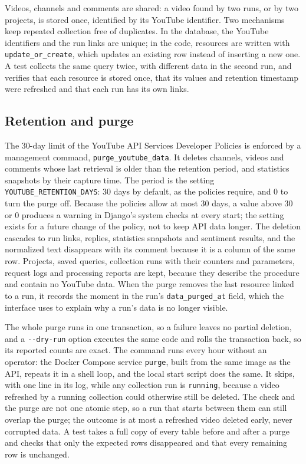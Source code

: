 Videos, channels and comments are shared: a video found by two runs, or by two projects, is stored once, identified by its YouTube identifier. Two mechanisms keep repeated collection free of duplicates. In the database, the YouTube identifiers and the run links are unique; in the code, resources are written with \texttt{update\_\allowbreak or\_\allowbreak create}, which updates an existing row instead of inserting a new one. A test collects the same query twice, with different data in the second run, and verifies that each resource is stored once, that its values and retention timestamp were refreshed and that each run has its own links.

\subsection{Retention and purge}

The 30-day limit of the YouTube API Services Developer Policies \autocite{youtube_api_services_developer_policies} is enforced by a management command, \texttt{purge\_\allowbreak youtube\_\allowbreak data}. It deletes channels, videos and comments whose last retrieval is older than the retention period, and statistics snapshots by their capture time. The period is the setting \texttt{YOUTUBE\_\allowbreak RETENTION\_\allowbreak DAYS}: 30 days by default, as the policies require, and 0 to turn the purge off. Because the policies allow at most 30 days, a value above 30 or 0 produces a warning in Django's system checks at every start; the setting exists for a future change of the policy, not to keep API data longer. The deletion cascades to run links, replies, statistics snapshots and sentiment results, and the normalized text disappears with its comment because it is a column of the same row. Projects, saved queries, collection runs with their counters and parameters, request logs and processing reports are kept, because they describe the procedure and contain no YouTube data. When the purge removes the last resource linked to a run, it records the moment in the run's \texttt{data\_\allowbreak purged\_\allowbreak at} field, which the interface uses to explain why a run's data is no longer visible.

The whole purge runs in one transaction, so a failure leaves no partial deletion, and a \texttt{-{}-dry-run} option executes the same code and rolls the transaction back, so its reported counts are exact. The command runs every hour without an operator: the Docker Compose service \texttt{purge}, built from the same image as the API, repeats it in a shell loop, and the local start script does the same. It skips, with one line in its log, while any collection run is \texttt{running}, because a video refreshed by a running collection could otherwise still be deleted. The check and the purge are not one atomic step, so a run that starts between them can still overlap the purge; the outcome is at most a refreshed video deleted early, never corrupted data. A test takes a full copy of every table before and after a purge and checks that only the expected rows disappeared and that every remaining row is unchanged.
